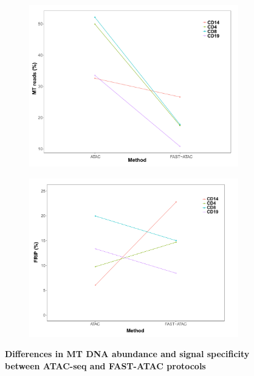 \begin{figure}[htbp]
\centering
\begin{subfigure}{0.5\textwidth}
\centering
\includegraphics[width=\textwidth]{./Results1/pdfs/ATAC_vs_FAST_ATAC_percnt_MT_reads_dotplot}
\caption{\textbf{}}
\end{subfigure}%
\begin{subfigure}{0.5\textwidth}
\centering
\includegraphics[width=\textwidth]{./Results1/pdfs/ATAC_vs_FAST_ATAC_FRiP_dotplot}
\caption{\textbf{}}
\end{subfigure}
\caption[Differences in MT DNA abundance and signal specificity between ATAC-seq and FAST-ATAC protocols]{\textbf{Differences in MT DNA abundance and signal specificity between ATAC-seq and FAST-ATAC protocols}}
\label{fig:ATAC_vs_FAST_ATAC}
\end{figure} 


